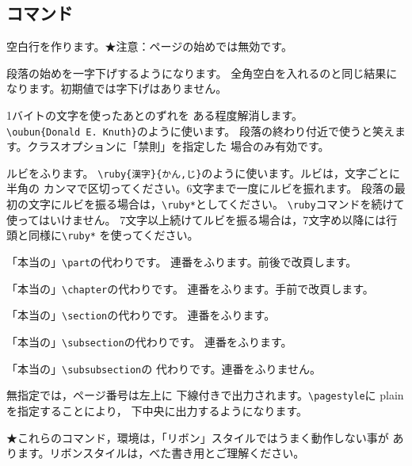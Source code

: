 \documentclass{jarticle}
\begin{document}
\subsection{コマンド}
\begin{kajogaki}[　　　　　　　　]
    \item[$\backslash$空行]空白行を作ります。★注意：ページの始めでは無効です。
    \item[$\backslash$一字下げ]段落の始めを一字下げするようになります。
    全角空白を入れるのと同じ結果になります。初期値では字下げはありません。
    \item[$\backslash$oubun]1バイトの文字を使ったあとのずれを
    ある程度解消します。\\
    \verb+\oubun{Donald E. Knuth}+のように使います。
    段落の終わり付近で使うと笑えます。クラスオプションに「禁則」を指定した
    場合のみ有効です。
    \item[$\backslash$ruby]ルビをふります。
    \verb+\ruby{漢字}{かん,じ}+のように使います。ルビは，文字ごとに半角の
    カンマで区切ってください。6文字まで一度にルビを振れます。
    段落の最初の文字にルビを振る場合は，\verb+\ruby*+としてください。
    \verb+\ruby+コマンドを続けて使ってはいけません。
    7文字以上続けてルビを振る場合は，7文字め以降には行頭と同様に\verb+\ruby*+
    を使ってください。
    \item[$\backslash$part]「本当の」\verb+\part+の代わりです。
    連番をふります。前後で改頁します。
    \item[$\backslash$chapter]「本当の」\verb+\chapter+の代わりです。
    連番をふります。手前で改頁します。
    \item[$\backslash$section]「本当の」\verb+\section+の代わりです。
    連番をふります。
    \item[$\backslash$subsection]「本当の」\verb+\subsection+の代わりです。
    連番をふります。
    \item[$\backslash$subsubsection]「本当の」\verb+\subsubsection+の
    代わりです。連番をふりません。
    \item[$\backslash$pagestyle]無指定では，ページ番号は左上に
    下線付きで出力されます。\verb+\pagestyle+に plain を指定することにより，
    下中央に出力するようになります。
\end{kajogaki}
★これらのコマンド，環境は，「リボン」スタイルではうまく動作しない事が
あります。リボンスタイルは，べた書き用とご理解ください。
\end{document}
